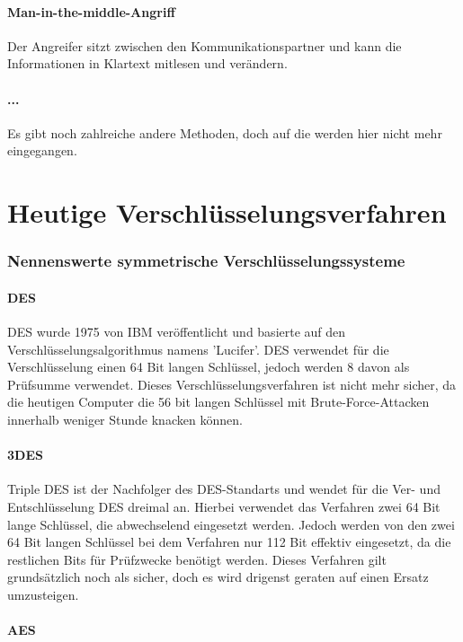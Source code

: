 \documentclass[12pt,a4paper]{report}
\begin{document}
\begin{onehalfspace}
\paragraph{Man-in-the-middle-Angriff} Der Angreifer sitzt zwischen den Kommunikationspartner und kann die Informationen in Klartext mitlesen und verändern.

\paragraph{...} Es gibt noch zahlreiche andere Methoden, doch auf die werden hier nicht mehr eingegangen. 

\section{Heutige Verschlüsselungsverfahren}

\subsubsection{Nennenswerte symmetrische Verschlüsselungssysteme}

\paragraph{DES}

DES wurde 1975 von IBM veröffentlicht und basierte auf den Verschlüsselungsalgorithmus namens 'Lucifer'. DES verwendet für die Verschlüsselung einen 64 Bit langen Schlüssel, jedoch werden 8 davon als Prüfsumme verwendet. Dieses Verschlüsselungsverfahren ist nicht mehr sicher, da die heutigen Computer die 56 bit langen Schlüssel mit Brute-Force-Attacken innerhalb weniger Stunde knacken können.

\paragraph{3DES}

Triple DES ist der Nachfolger des DES-Standarts und wendet für die Ver- und Entschlüsselung DES dreimal an. Hierbei verwendet das Verfahren zwei 64 Bit lange Schlüssel, die abwechselend eingesetzt werden. Jedoch werden von den zwei 64 Bit langen Schlüssel bei dem Verfahren nur 112 Bit effektiv eingesetzt, da die restlichen Bits für Prüfzwecke benötigt werden. Dieses Verfahren gilt grundsätzlich noch als sicher, doch es wird drigenst geraten auf einen Ersatz umzusteigen.

\paragraph{AES}


\end{onehalfspace}
\end{document}
